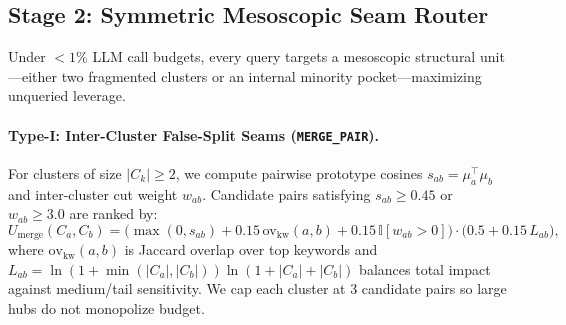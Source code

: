 \subsection{Stage 2: Symmetric Mesoscopic Seam Router}
Under $<1\%$ LLM call budgets, every query targets a mesoscopic structural unit---either two fragmented clusters or an internal minority pocket---maximizing unqueried leverage.

\paragraph{Type-I: Inter-Cluster False-Split Seams (\texttt{MERGE\_PAIR}).}
For clusters of size $|C_k| \ge 2$, we compute pairwise prototype cosines $s_{ab} = \mu_a^\top \mu_b$ and inter-cluster cut weight $w_{ab}$. Candidate pairs satisfying $s_{ab} \ge 0.45$ or $w_{ab} \ge 3.0$ are ranked by:
\begin{equation}
\label{eq:u_merge}
U_{\text{merge}}(C_a, C_b) = \Big(\max(0, s_{ab}) + 0.15\,\text{ov}_{\text{kw}}(a, b) + 0.15\,\mathbb{I}[w_{ab} > 0]\Big) \cdot \Big(0.5 + 0.15\,L_{ab}\Big),
\end{equation}
where $\text{ov}_{\text{kw}}(a,b)$ is Jaccard overlap over top keywords and $L_{ab} = \ln(1 + \min(|C_a|, |C_b|))\ln(1 + |C_a| + |C_b|)$ balances total impact against medium/tail sensitivity. We cap each cluster at $3$ candidate pairs so large hubs do not monopolize budget.

